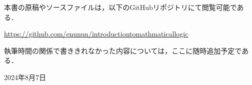 本書の原稿やソースファイルは，以下のGitHubリポジトリにて閲覧可能である．

\begin{center}
	\url{https://github.com/enunun/introductiontomathmaticallogic}
\end{center}

執筆時間の関係で書ききれなかった内容については，ここに随時追加予定である．

\begin{flushright}
	2024年8月7日
\end{flushright}